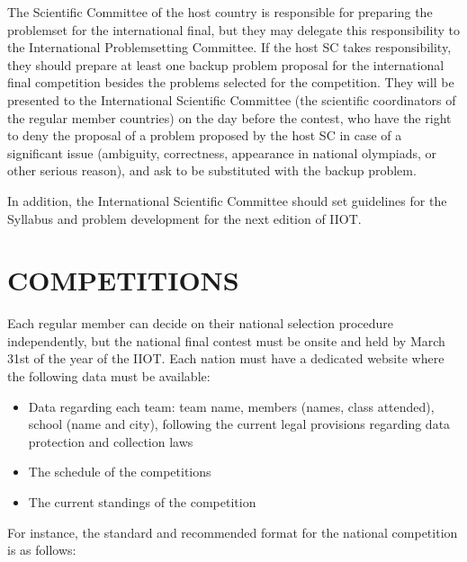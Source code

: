 \documentclass{article}
\begin{document}
The Scientific Committee of the host country is responsible for preparing the problemset for the international final, but they may delegate this responsibility to the International Problemsetting Committee. If the host SC takes responsibility, they should prepare at least one backup problem proposal for the international final competition besides the problems selected for the competition. They will be presented to the International Scientific Committee (the scientific coordinators of the regular member countries) on the day before the contest, who have the right to deny the proposal of a problem proposed by the host SC in case of a significant issue (ambiguity, correctness, appearance in national olympiads, or other serious reason), and ask to be substituted with the backup problem.

In addition, the International Scientific Committee should set guidelines for the Syllabus and problem development for the next edition of IIOT. 

\section{COMPETITIONS} 

Each regular member can decide on their national selection procedure independently, but the national final contest must be onsite and held by March 31st of the year of the IIOT. Each nation must have a dedicated website where the following data must be available:

\begin{itemize}
    \item Data regarding each team: team name, members (names, class attended), school (name and city), following the current legal provisions regarding data protection and collection laws
    \item The schedule of the competitions
    \item The current standings of the competition
\end{itemize}

For instance, the standard and recommended format for the national competition is as follows: 
\end{document}
